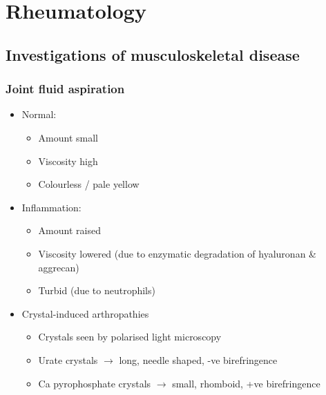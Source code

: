 \documentclass[
  12pt,
]{memoir}
\providecommand{\tightlist}{%
  \setlength{\itemsep}{0pt}\setlength{\parskip}{0pt}}
\begin{document}
\pagebreak

\hypertarget{rheumatology}{%
\chapter{Rheumatology}\label{rheumatology}}

\hypertarget{investigations-of-musculoskeletal-disease}{%
\section{Investigations of musculoskeletal
disease}\label{investigations-of-musculoskeletal-disease}}

\hypertarget{joint-fluid-aspiration}{%
\subsection{Joint fluid aspiration}\label{joint-fluid-aspiration}}

\begin{itemize}
\tightlist
\item
  Normal:

  \begin{itemize}
  \tightlist
  \item
    Amount small
  \item
    Viscosity high
  \item
    Colourless / pale yellow
  \end{itemize}
\item
  Inflammation:

  \begin{itemize}
  \tightlist
  \item
    Amount raised
  \item
    Viscosity lowered (due to enzymatic degradation of hyaluronan \&
    aggrecan)
  \item
    Turbid (due to neutrophils)
  \end{itemize}
\item
  Crystal-induced arthropathies

  \begin{itemize}
  \tightlist
  \item
    Crystals seen by polarised light microscopy
  \item
    Urate crystals \(\rightarrow\) long, needle shaped, -ve
    birefringence
  \item
    Ca pyrophosphate crystals \(\rightarrow\) small, rhomboid, +ve
    birefringence
  \end{itemize}
\end{itemize}
\end{document}
